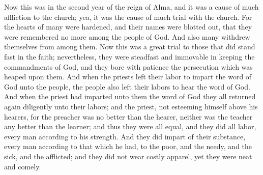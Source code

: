 \bverse \iffalse Now this was in the second year of the reign of Alma, and it was a cause of much affliction to the church; yea, it was the cause of much trial with the church. \fi
Now this was in the second year of the reign of Alma, and it was a cause of much affliction to the church; yea, it was the cause of much trial with the church.
\bverse \iffalse For the hearts of many were hardened, and their names were blotted out, that they were remembered no more among the people of God. And also many withdrew themselves from among them. \fi
For the hearts of many were hardened, and their names were blotted out, that they were remembered no more among the people of God. And also many withdrew themselves from among them.
\bverse \iffalse Now this was a great trial to those that did stand fast in the faith; nevertheless, they were steadfast and immovable in keeping the commandments of God, and they bore with patience the persecution which was heaped upon them. \fi
Now this was a great trial to those that did stand fast in the faith; nevertheless, they were steadfast and immovable in keeping the commandments of God, and they bore with patience the persecution which was heaped upon them.
\bverse \iffalse And when the priests left their labor to impart the word of God unto the people, the people also left their labors to hear the word of God. And when the priest had imparted unto them the word of God they all returned again diligently unto their labors; and the priest, not esteeming himself above his hearers, for the preacher was no better than the hearer, neither was the teacher any better than the learner; and thus they were all equal, and they did all labor, every man according to his strength. \fi
And when the priests left their labor to impart the word of God unto the people, the people also left their labors to hear the word of God. And when the priest had imparted unto them the word of God they all returned again diligently unto their labors; and the priest, not esteeming himself above his hearers, for the preacher was no better than the hearer, neither was the teacher any better than the learner; and thus they were all equal, and they did all labor, every man according to his strength.
\bverse \iffalse And they did impart of their substance, every man according to that which he had, to the poor, and the needy, and the sick, and the afflicted; and they did not wear costly apparel, yet they were neat and comely. \fi
And they did impart of their substance, every man according to that which he had, to the poor, and the needy, and the sick, and the afflicted; and they did not wear costly apparel, yet they were neat and comely.
